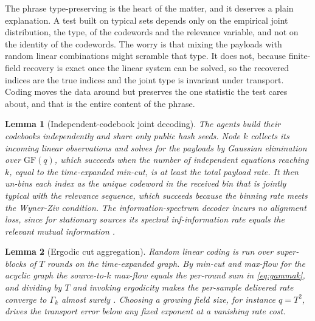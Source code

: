 \documentclass[journal]{IEEEtran}
\newtheorem{lemma}{Lemma}
\theoremstyle{definition}
\theoremstyle{remark}
\newcommand{\Gk}{\Gamma_k}
\begin{document}
The phrase type-preserving is the heart of the matter, and it deserves a plain explanation. A test built on
typical sets depends only on the empirical joint distribution, the type, of the codewords and the relevance
variable, and not on the identity of the codewords. The worry is that mixing the payloads with random linear
combinations might scramble that type. It does not, because finite-field recovery is exact once the linear system
can be solved, so the recovered indices are the true indices and the joint type is invariant under transport.
Coding moves the data around but preserves the one statistic the test cares about, and that is the entire content
of the phrase.

\begin{lemma}[Independent-codebook joint decoding]\label{lem:decode}
The agents build their codebooks independently and share only public hash seeds. Node $k$ collects its incoming
linear observations and solves for the payloads by Gaussian elimination over $\mathrm{GF}(q)$, which succeeds when
the number of independent equations reaching $k$, equal to the time-expanded min-cut, is at least the total
payload rate. It then un-bins each index as the unique codeword in the received bin that is jointly typical with
the relevance sequence, which succeeds because the binning rate meets the Wyner-Ziv condition. The
information-spectrum decoder incurs no alignment loss, since for stationary sources its spectral inf-information
rate equals the relevant mutual information \cite{han2003}.
\end{lemma}

\begin{lemma}[Ergodic cut aggregation]\label{lem:aggregate}
Random linear coding is run over super-blocks of $T$ rounds on the time-expanded graph. By min-cut and max-flow
for the acyclic graph the source-to-$k$ max-flow equals the per-round sum in \eqref{eq:gammak}, and dividing by
$T$ and invoking ergodicity makes the per-sample delivered rate converge to $\Gk$ almost surely
\cite{aclY2000,liyeungcai2003}. Choosing a growing field size, for instance $q=T^2$, drives the transport error
below any fixed exponent at a vanishing rate cost.
\end{lemma}
\end{document}
